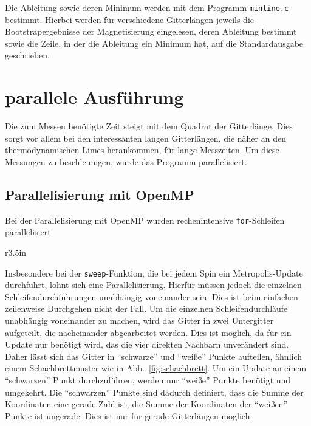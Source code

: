 	Die Ableitung sowie deren Minimum werden mit dem Programm \texttt{minline.c} bestimmt. Hierbei werden für verschiedene Gitterlängen jeweils die Bootstrapergebnisse der Magnetisierung eingelesen, deren Ableitung bestimmt sowie die Zeile, in der die Ableitung ein Minimum hat, auf die Standardausgabe geschrieben.
		
	
	\section{parallele Ausführung}
	\label{sec:parallelimplementierung}


	
	Die zum Messen benötigte Zeit steigt mit dem Quadrat der Gitterlänge. Dies sorgt vor allem bei den interessanten langen Gitterlängen, die näher an den thermodynamischen Limes herankommen, für lange Messzeiten. Um diese Messungen zu beschleunigen, wurde das Programm parallelisiert.
	
	\subsection{Parallelisierung mit OpenMP}
	\label{subsec:paropenmp}
	Bei der Parallelisierung mit OpenMP wurden rechenintensive \texttt{for}-Schleifen parallelisiert.
	
	
	\begin{wrapfigure}{r}{3.5in}
		\centering
		
		\caption{Schachbrettmuster}
		\label{fig:schachbrett}
	\end{wrapfigure}
	
	Insbesondere bei der \texttt{sweep}-Funktion, die bei jedem Spin ein Metropolis-Update durchführt, lohnt sich eine Parallelisierung. Hierfür müssen jedoch die einzelnen Schleifendurchführungen unabhängig voneinander sein. Dies ist beim einfachen zeilenweise Durchgehen nicht der Fall.
	Um die einzelnen Schleifendurchläufe unabhängig voneinander zu machen, wird das Gitter in zwei Untergitter aufgeteilt, die nacheinander abgearbeitet werden. Dies ist möglich, da für ein Update nur benötigt wird, das die vier direkten Nachbarn unverändert sind. Daher lässt sich das Gitter in \enquote{schwarze}
	und \enquote{weiße} Punkte aufteilen, ähnlich einem Schachbrettmuster wie in Abb.~\ref{fig:schachbrett}. Um ein Update an einem \enquote{schwarzen} Punkt durchzuführen, werden nur \enquote{weiße} Punkte benötigt und umgekehrt. Die \enquote{schwarzen} Punkte sind dadurch definiert, dass die Summe der Koordinaten eine gerade Zahl ist, die Summe der Koordinaten der \enquote{weißen} Punkte ist ungerade. Dies ist nur für gerade Gitterlängen möglich.
	
